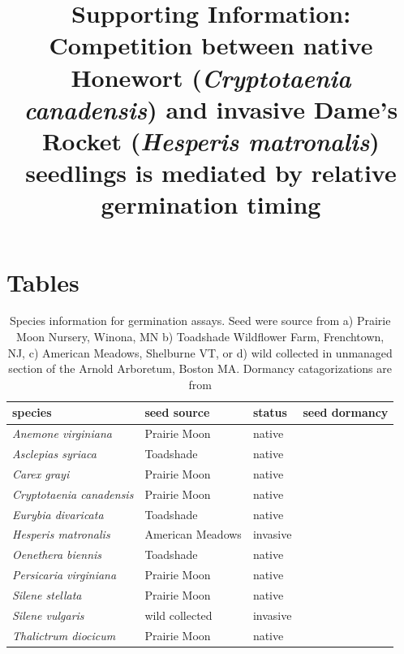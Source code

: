\documentclass{article}
\title{Supporting Information: Competition between native Honewort (\textit{Cryptotaenia canadensis}) and invasive Dame's Rocket (\textit{Hesperis matronalis}) seedlings is mediated by relative germination timing}
\date{}
\begin{document}



\maketitle

\section*{Tables}
\begin{table}[ht]
\centering
\begin{tabular}{|l|l|l|l|}
\hline
species & seed source & status & seed dormancy \\
\hline
\textit{Anemone virginiana} & Prairie Moon & native & \\
\textit{Asclepias syriaca} & Toadshade & native & \\
\textit{Carex grayi} & Prairie Moon & native & \\
\textit{Cryptotaenia canadensis} & Prairie Moon & native & \\
\textit{Eurybia divaricata} & Toadshade & native & \\
\textit{Hesperis matronalis} & American Meadows & invasive & \\
\textit{Oenethera biennis} & Toadshade & native & \\
\textit{Persicaria virginiana} & Prairie Moon & native & \\
\textit{Silene stellata} & Prairie Moon & native & \\
\textit{Silene vulgaris} & wild collected & invasive & \\
\textit{Thalictrum diocicum} & Prairie Moon & native & \\
\hline

\end{tabular}
\caption{Species information for germination assays. Seed were source from a) Prairie Moon Nursery, Winona, MN b) Toadshade Wildflower Farm, Frenchtown, NJ, c) American Meadows, Shelburne VT, or d) wild collected in unmanaged section of the Arnold Arboretum, Boston MA. Dormancy catagorizations are from \citet{Baskin2015} }
\label{tab:specs}
\end{table}
\end{document}
